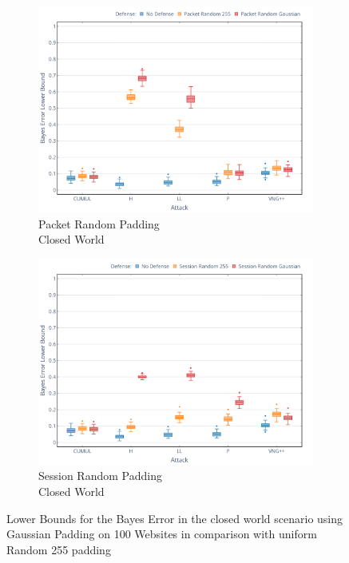 \documentclass[
	ruledheaders=chapter,
	class=report,
	thesis={type=master, department=inf},
	accentcolor=1c,
	custommargins=true,
	marginpar=false,
	parskip=half-,
	fontsize=11pt,
]{tudapub}
\begin{document}
	\begin{figure}
		\begin{subfigure}{0.495\textwidth}
			\centering
			\includegraphics[width=\textwidth]{plots/bounds_cw_pkt.png}
			\caption{Packet Random Padding\\Closed World}
		\end{subfigure}
		\hfill
		\begin{subfigure}{0.495\textwidth}
			\centering
			\includegraphics[width=\textwidth]{plots/bounds_cw_ses.png}
			\caption{Session Random Padding\\Closed World}
		\end{subfigure}
		\caption[Lower Bounds for the Bayes Error in the closed world scenario]{Lower Bounds for the Bayes Error in the closed world scenario using Gaussian Padding on 100 Websites in comparison with uniform Random 255 padding}
		\label{fig:bound_cw}
	\end{figure}
\end{document}
